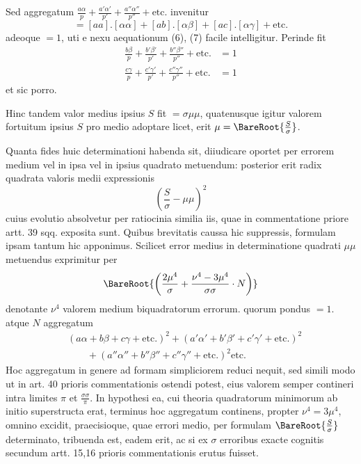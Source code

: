 Sed aggregatum \(\frac{a\alpha}{p}+\frac{a'\alpha'}{p'}+\frac{a''\alpha''}{p''}+\text{etc.}\) invenitur
\[
=[aa].[\alpha\alpha]+[ab].[\alpha\beta]+[ac].[\alpha\gamma]+\text{etc.}
\]
adeoque \(=1\), uti e nexu aequationum (6), (7) facile intelligitur. Perinde fit
\[
\begin{aligned}
\frac{b\beta}{p}+\frac{b'\beta'}{p'}+\frac{b''\beta''}{p''}+\text{etc.}&=1\\[5pt]
\frac{c\gamma}{p}+\frac{c'\gamma'}{p'}+\frac{c''\gamma''}{p''}+\text{etc.}&=1
\end{aligned}
\]
et sic porro.

Hinc tandem valor medius ipsius \(S\) fit \(=\sigma\mu\mu\), quatenusque igitur valorem fortuitum ipsius \(S\) pro medio adoptare licet, erit \(\mu=\BareRoot{\frac S\sigma}\).

Quanta fides huic determinationi habenda sit, diiudicare oportet per errorem medium vel in ipsa vel in ipsius quadrato metuendum: posterior erit radix
quadrata valoris medii expressionis
\[
\left(\frac S\sigma-\mu\mu\right)^2
\]
cuius evolutio absolvetur per ratiocinia similia iis, quae in commentatione priore artt. 39 sqq. exposita sunt. Quibus brevitatis caussa hic suppressis, formulam ipsam tantum hic apponimus. Scilicet error medius in determinatione quadrati \(\mu\mu\) metuendus exprimitur per
\[
\BareRoot{\left(\frac{2\mu^4}{\sigma}+\frac{\nu^4-3\mu^4}{\sigma\sigma}\cdot N\right)}
\]
denotante \(\nu^4\) valorem medium biquadratorum errorum. quorum pondus \(=1.\) atque \(N\) aggregatum
\[
\begin{aligned}
&(a\alpha+b\beta+c\gamma+\text{etc.})^2+(a'\alpha'+b'\beta'+c'\gamma'+\text{etc.})^2\\
&\qquad+(a''\alpha''+b''\beta''+c''\gamma''+\text{etc.})^2\text{etc.}
\end{aligned}
\]
Hoc aggregatum in genere ad formam simpliciorem reduci nequit, sed simili modo ut in art. 40 prioris commentationis ostendi potest, eius valorem semper contineri intra limites \(\pi\) et \(\frac{\sigma\sigma}{\pi}\). In hypothesi ea, cui theoria quadratorum minimorum ab initio superstructa erat, terminus hoc aggregatum continens, propter \(\nu^4=3\mu^4\), omnino excidit, praecisioque, quae errori medio, per formulam \(\BareRoot{\frac S\sigma}\) determinato, tribuenda est, eadem erit, ac si ex \(\sigma\) erroribus exacte cognitis secundum artt. 15,16 prioris commentationis erutus fuisset.

